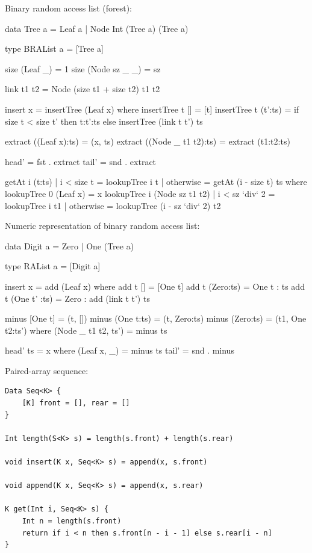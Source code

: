 \documentclass[b5paper]{article}
\begin{document}
Binary random access list (forest):

\lstset{frame = single}
\begin{Haskell}
data Tree a = Leaf a
            | Node Int (Tree a) (Tree a)

type BRAList a = [Tree a]

size (Leaf _) = 1
size (Node sz _ _) = sz

link t1 t2 = Node (size t1 + size t2) t1 t2

insert x = insertTree (Leaf x) where
    insertTree t [] = [t]
    insertTree t (t':ts) = if size t < size t' then  t:t':ts
                           else insertTree (link t t') ts

extract ((Leaf x):ts) = (x, ts)
extract ((Node _ t1 t2):ts) = extract (t1:t2:ts)

head' = fst . extract
tail' = snd . extract

getAt i (t:ts) | i < size t = lookupTree i t
               | otherwise = getAt (i - size t) ts
  where
    lookupTree 0 (Leaf x) = x
    lookupTree i (Node sz t1 t2)
        | i < sz `div` 2 = lookupTree i t1
        | otherwise = lookupTree (i - sz `div` 2) t2
\end{Haskell}

Numeric representation of binary random access list:

\begin{Haskell}
data Digit a = Zero | One (Tree a)

type RAList a = [Digit a]

insert x = add (Leaf x) where
  add t [] = [One t]
  add t (Zero:ts) = One t : ts
  add t (One t' :ts) = Zero : add (link t t') ts

minus [One t] = (t, [])
minus (One t:ts) = (t, Zero:ts)
minus (Zero:ts) = (t1, One t2:ts') where
    (Node _ t1 t2, ts') = minus ts

head' ts = x where (Leaf x, _) = minus ts
tail' = snd . minus
\end{Haskell}

Paired-array sequence:

\begin{lstlisting}[language = Bourbaki]
Data Seq<K> {
    [K] front = [], rear = []
}

Int length(S<K> s) = length(s.front) + length(s.rear)

void insert(K x, Seq<K> s) = append(x, s.front)

void append(K x, Seq<K> s) = append(x, s.rear)

K get(Int i, Seq<K> s) {
    Int n = length(s.front)
    return if i < n then s.front[n - i - 1] else s.rear[i - n]
}
\end{lstlisting}
\end{document}
